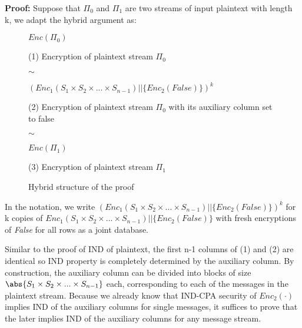 \documentclass[10pt]{article}
\begin{document}
\textbf{Proof: } Suppose that $\Pi_0$ and $\Pi_1$ are two streams of input plaintext with length k, we adapt the hybrid argument as:
\begin{figure}[H]
	\begin{minipage}[center]{0.25\linewidth}
		\begin{framed}
			$Enc(\Pi_0)$\\
		\end{framed}
		(1) Encryption of plaintext stream $\Pi_0$ \\
	\end{minipage}
	\hfill
	{\Huge{$\sim$}}
	\hfill
	\begin{minipage}[center]{0.35\linewidth}
		\begin{framed}
			$(Enc_1(S_1 \times S_2 \times ... \times S_{n-1}) || \{Enc_2(False)\})^k$
		\end{framed}
		(2) Encryption of plaintext stream $\Pi_0$ with its auxiliary column set to false
	\end{minipage}
	\hfill
	{\Huge{$\sim$}}
	\hfill
	\begin{minipage}[center]{0.25\linewidth}
		\begin{framed}
			$Enc(\Pi_1)$\\
		\end{framed}
		(3) Encryption of plaintext stream $\Pi_1$  \\
	\end{minipage}
	
	\caption{Hybrid structure of the proof}
	\label{Hybrid2}
\end{figure}

In the notation, we write $(Enc_1(S_1 \times S_2 \times ... \times S_{n-1}) || \{Enc_2(False)\})^k$ for k copies of $Enc_1(S_1 \times S_2 \times ... \times S_{n-1}) || \{Enc_2(False)\}$ with fresh encryptions of \textit{False} for all rows as a joint database.

Similar to the proof of IND of plaintext, the first n-1 columns of (1) and (2) are identical so IND property is completely determined by the auxiliary column. By construction, the auxiliary column can be divided into blocks of size $\abs{S_1 \times S_2 \times ... \times S_{n-1}}$ each, corresponding to each of the messages in the plaintext stream. Because we already know that IND-CPA security of $Enc_2(\cdot)$ implies IND of the auxiliary columns for single messages, it suffices to prove that the later implies IND of the auxiliary columns for any message stream.
\end{document}
